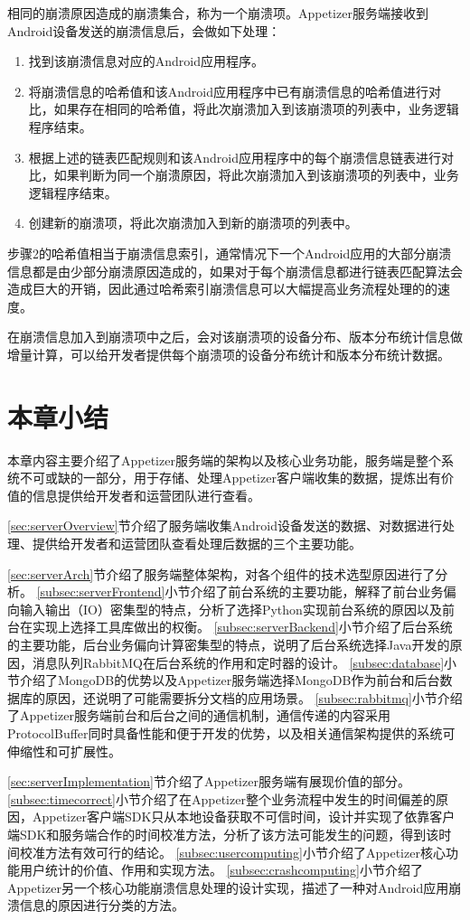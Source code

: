 相同的崩溃原因造成的崩溃集合，称为一个崩溃项。Appetizer服务端接收到Android设备发送的崩溃信息后，会做如下处理：

\begin{enumerate}
	\item 找到该崩溃信息对应的Android应用程序。
	\item 将崩溃信息的哈希值和该Android应用程序中已有崩溃信息的哈希值进行对比，如果存在相同的哈希值，将此次崩溃加入到该崩溃项的列表中，业务逻辑程序结束。
	\item 根据上述的链表匹配规则和该Android应用程序中的每个崩溃信息链表进行对比，如果判断为同一个崩溃原因，将此次崩溃加入到该崩溃项的列表中，业务逻辑程序结束。
	\item 创建新的崩溃项，将此次崩溃加入到新的崩溃项的列表中。
\end{enumerate} 

步骤2的哈希值相当于崩溃信息索引，通常情况下一个Android应用的大部分崩溃信息都是由少部分崩溃原因造成的，如果对于每个崩溃信息都进行链表匹配算法会造成巨大的开销，因此通过哈希索引崩溃信息可以大幅提高业务流程处理的的速度。

在崩溃信息加入到崩溃项中之后，会对该崩溃项的设备分布、版本分布统计信息做增量计算，可以给开发者提供每个崩溃项的设备分布统计和版本分布统计数据。

\section{本章小结}

本章内容主要介绍了Appetizer服务端的架构以及核心业务功能，服务端是整个系统不可或缺的一部分，用于存储、处理Appetizer客户端收集的数据，提炼出有价值的信息提供给开发者和运营团队进行查看。

\ref{sec:serverOverview}节介绍了服务端收集Android设备发送的数据、对数据进行处理、提供给开发者和运营团队查看处理后数据的三个主要功能。

\ref{sec:serverArch}节介绍了服务端整体架构，对各个组件的技术选型原因进行了分析。
\ref{subsec:serverFrontend}小节介绍了前台系统的主要功能，解释了前台业务偏向输入输出（IO）密集型的特点，分析了选择Python实现前台系统的原因以及前台在实现上选择工具库做出的权衡。
\ref{subsec:serverBackend}小节介绍了后台系统的主要功能，后台业务偏向计算密集型的特点，说明了后台系统选择Java开发的原因，消息队列RabbitMQ在后台系统的作用和定时器的设计。
\ref{subsec:database}小节介绍了MongoDB的优势以及Appetizer服务端选择MongoDB作为前台和后台数据库的原因，还说明了可能需要拆分文档的应用场景。
\ref{subsec:rabbitmq}小节介绍了Appetizer服务端前台和后台之间的通信机制，通信传递的内容采用ProtocolBuffer同时具备性能和便于开发的优势，以及相关通信架构提供的系统可伸缩性和可扩展性。

\ref{sec:serverImplementation}节介绍了Appetizer服务端有展现价值的部分。
\ref{subsec:timecorrect}小节介绍了在Appetizer整个业务流程中发生的时间偏差的原因，Appetizer客户端SDK只从本地设备获取不可信时间，设计并实现了依靠客户端SDK和服务端合作的时间校准方法，分析了该方法可能发生的问题，得到该时间校准方法有效可行的结论。
\ref{subsec:usercomputing}小节介绍了Appetizer核心功能用户统计的价值、作用和实现方法。
\ref{subsec:crashcomputing}小节介绍了Appetizer另一个核心功能崩溃信息处理的设计实现，描述了一种对Android应用崩溃信息的原因进行分类的方法。
